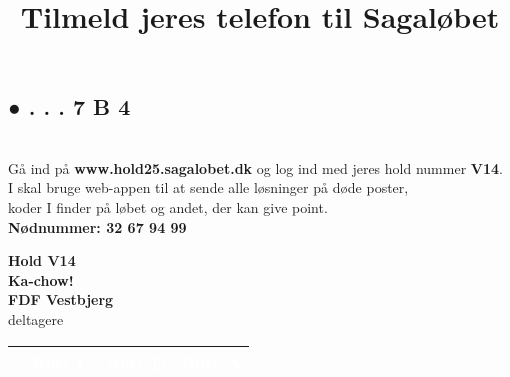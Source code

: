 \subsection{\textcolor{søblå}{● . . . 7 B 4}}
\newpage
\title{Tilmeld jeres telefon til Sagaløbet}\\
{\fontsize{15}{36}\selectfont
Gå ind på \textbf{www.hold25.sagalobet.dk} og log ind med jeres hold nummer \textbf{V14}.\\
I skal bruge web-appen til at sende alle løsninger på døde poster,\\
koder I finder på løbet og andet, der kan give point.\\
\textbf{\textcolor{efterårsrød}{Nødnummer: 32 67 94 99}}\\
}
\begin{center}
{\fontsize{140}{60}\selectfont\textbf{Hold \textcolor{søblå}{V14}}\\}
{\fontsize{30}{50}\selectfont\textbf{\textcolor{søblå}{Ka-chow!}}\\}
{\fontsize{20}{50}\selectfont\textbf{FDF Vestbjerg}\\}
{\fontsize{20}{40} deltagere\\}
{\vspace{0,5cm}}

\begin{tabular}{|>{\centering\arraybackslash}p{3cm}|
                >{\centering\arraybackslash}p{3cm}|
                >{\centering\arraybackslash}p{3cm}|
                >{\centering\arraybackslash}p{3cm}|}
\hline
\cellcolor{søblå}\textbf{\textcolor{white}{\rule{0pt}{3cm}Rute B}} &
\cellcolor{korngul}\textbf{\textcolor{white}{Rute C}} &
\cellcolor{græsgrøn}\textbf{\textcolor{white}{Rute D}} &
\cellcolor{efterårsrød}\textbf{\textcolor{white}{Rute A}} \\
\hline
\end{tabular}\\
\end{center}
\vspace{-19.1cm}
